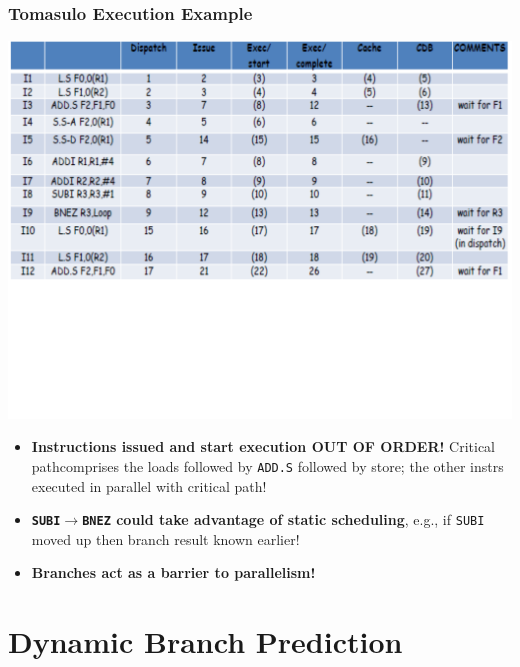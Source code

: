 \documentclass{beamer}
\newcommand{\emp}[1]{\textcolor{DikuRed}{ #1}}
\newcommand{\emphh}[1]{\textcolor{CosGreen}{ #1}}
\begin{document}
\begin{frame}[fragile,t]
\frametitle{Tomasulo Execution Example}

\includegraphics[width=64ex]{FigsOoOProc/TomasuloEg.pdf}
\vspace{-19ex}

\begin{itemize}
    \item \emphh{\bf Instructions issued and start execution OUT OF ORDER!}
            Critical path\pause comprises the loads followed by {\tt ADD.S}
            followed by store; the other instrs executed in parallel with critical path! 
    \item \emp{\bf {\tt SUBI$\rightarrow$BNEZ} could take advantage of static scheduling}\pause, 
                e.g., if {\tt SUBI} moved up then branch result 
                known earlier!
    \item \alert{\bf Branches act as a barrier to parallelism!} 
\end{itemize}
\end{frame}

\section{Dynamic Branch Prediction}

\begin{frame}[fragile]
	\tableofcontents[currentsection]
\end{frame}
\end{document}

